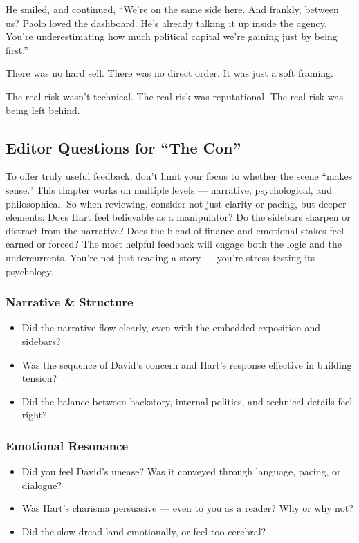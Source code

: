 He smiled, and continued, ``We’re on the same side here. And frankly, between us? Paolo loved the dashboard. He’s already 
talking it up inside the agency. You’re underestimating how much political capital we’re gaining just by being first.''

There was no hard sell. There was no direct order.  It was just a soft framing.  

The real risk wasn’t technical.  
The real risk was reputational.  
The real risk was being left behind.


\subsection{Editor Questions for ``The Con''}

To offer truly useful feedback, don’t limit your focus to whether the scene “makes sense.” This chapter works on multiple levels 
— narrative, psychological, and philosophical. So when reviewing, consider not just clarity or pacing, but deeper elements: Does 
Hart feel believable as a manipulator? Do the sidebars sharpen or distract from the narrative? Does the blend of finance and 
emotional stakes feel earned or forced? The most helpful feedback will engage both the logic and the undercurrents. You're not 
just reading a story — you're stress-testing its psychology.

\subsubsection{Narrative \& Structure}

\begin{itemize}
  \item Did the narrative flow clearly, even with the embedded exposition and sidebars?
  \item Was the sequence of David's concern and Hart’s response effective in building tension?
  \item Did the balance between backstory, internal politics, and technical details feel right?
\end{itemize}

\subsubsection{Emotional Resonance}

\begin{itemize}
  \item Did you feel David’s unease? Was it conveyed through language, pacing, or dialogue?
  \item Was Hart’s charisma persuasive — even to you as a reader? Why or why not?
  \item Did the slow dread land emotionally, or feel too cerebral?
\end{itemize}

